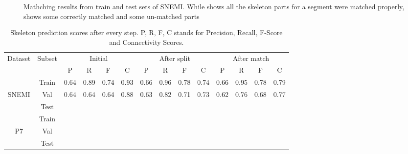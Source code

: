 \begin{figure}[htpb]
\begin{subfigure}[b]{0.4\textwidth}
		\caption{\label{fig:merged_val}}
	\end{subfigure}	
	\caption{Mathching results from  train and  test sets of SNEMI. While  shows all the skeleton parts for a segment were matched properly,  shows some correctly matched and some un-matched parts}  
	\label{fig:matchedSNEMI}
\end{figure}

\begin{table}[!ht]                                                                                          
	\centering
	\begin{adjustbox}{width=\textwidth,center=\textwidth}
	\begin{tabular}{|c|c|c|c|c|c|c|c|c|c|c|c|c|c|}                                                                      
		\hline                                                                                                  
		\multirow{2}{*}{Dataset} & \multirow{2}{*}{Subset} & \multicolumn{4}{c|}{Initial}  & \multicolumn{4}{c|}{After split}  & \multicolumn{4}{c|}{After match} \\                                    
		\cline{3-14}                                                                                                  
		&  & P & R & F & C & P & R & F & C & P & R & F & C \\                                                           
		\hline                                                                                                  
		\hline                                                                                                  
				& Train & 0.64 & 0.89 & 0.74 & 0.93 & 0.66 & 0.96 & 0.78 & 0.74 & 0.66 & 0.95 & 0.78  & 0.79\\                           
		SNEMI 	& Val 	& 0.64 & 0.64 & 0.64 & 0.88 & 0.63 & 0.82 & 0.71 & 0.73 & 0.62 & 0.76 & 0.68 & 0.77 \\           
				& Test 	&  &  &  &  &  &  &  &  &  &  &  & \\
		\hline		 
				& Train &  &  &  &  &  &  &  &  &  &  &  & \\                           
		P7 		& Val 	&  &  &  &  &  &  &  &  &  &  &  & \\           
				& Test 	&  &  &  &  &  &  &  &  &  &  &  & \\                          
		\hline                                                                                                     
	\end{tabular}
	\end{adjustbox}                                                
	\caption{Skeleton prediction scores after every step. P, R, F, C stands for Precision, Recall, F-Score and Connectivity Scores.}
	\label{tab:dissected_scores}                                                                   
\end{table}
